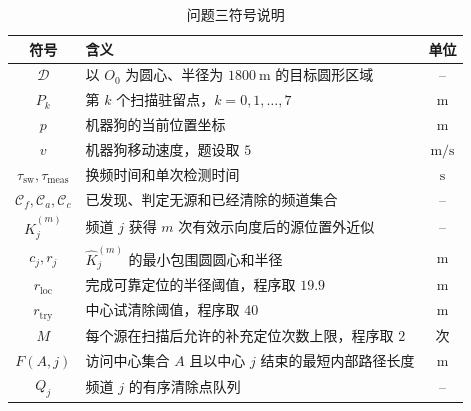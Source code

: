 \begin{table}[H]
  \centering
  \caption{问题三符号说明}
  \label{tab:q3-symbols}
  \begin{tabularx}{0.94\textwidth}{@{}cXc@{}}
    \toprule
    符号 & 含义 & 单位 \\
    \midrule
    $\mathcal D$ & 以 $O_0$ 为圆心、半径为 $1800\ \mathrm{m}$ 的目标圆形区域 & -- \\
    $P_k$ & 第 $k$ 个扫描驻留点，$k=0,1,\ldots,7$ & $\mathrm{m}$ \\
    $p$ & 机器狗的当前位置坐标 & $\mathrm{m}$ \\
    $v$ & 机器狗移动速度，题设取 $5$ & $\mathrm{m/s}$ \\
    $\tau_{\mathrm{sw}},\tau_{\mathrm{meas}}$ & 换频时间和单次检测时间 & $\mathrm{s}$ \\
    $\mathcal C_f,\mathcal C_a,\mathcal C_c$ & 已发现、判定无源和已经清除的频道集合 & -- \\
    $\widehat K_j^{(m)}$ & 频道 $j$ 获得 $m$ 次有效示向度后的源位置外近似 & -- \\
    $c_j,r_j$ & $\widehat K_j^{(m)}$ 的最小包围圆圆心和半径 & $\mathrm{m}$ \\
    $r_{\mathrm{loc}}$ & 完成可靠定位的半径阈值，程序取 $19.9$ & $\mathrm{m}$ \\
    $r_{\mathrm{try}}$ & 中心试清除阈值，程序取 $40$ & $\mathrm{m}$ \\
    $M$ & 每个源在扫描后允许的补充定位次数上限，程序取 $2$ & 次 \\
    $F(A,j)$ & 访问中心集合 $A$ 且以中心 $j$ 结束的最短内部路径长度 & $\mathrm{m}$ \\
    $Q_j$ & 频道 $j$ 的有序清除点队列 & -- \\
    \bottomrule
  \end{tabularx}
\end{table}


